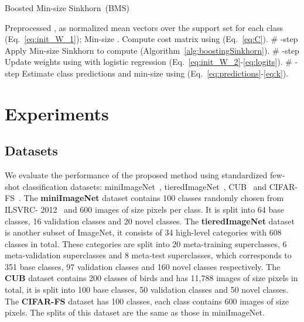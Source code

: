 \documentclass[review]{elsarticle}
\begin{document}
\begin{algorithm}[tb]
   \caption{Boosted Min-size Sinkhorn~(BMS)}
   \label{alg:CSC}
\begin{algorithmic}
    {}
    {Preprocessed , }
     as normalized mean vectors over the support set for each class (Eq.~\ref{eq:init_W_1}); Min-size .
   \STATE Compute cost matrix  using  (Eq.~\ref{eq:C}). \# -step
   \STATE Apply Min-size Sinkhorn to compute  (Algorithm~\ref{alg:boostingSinkhorn}). \# -step
   \STATE Update weights  using  with logistic regression (Eq.~\ref{eq:init_W_2}-\ref{eq:logits}). \# -step
   \STATE Estimate class predictions  and min-size  using  (Eq.~\ref{eq:predictions}-\ref{eq:k}).
   \ENDFOR
{} 
\end{algorithmic}
\end{algorithm}





















\section{Experiments}
\label{experiments}
\subsection{Datasets}

We evaluate the performance of the proposed method using standardized few-shot classification datasets: miniImageNet~\cite{vinyals2016matching}, tieredImageNet~\cite{DBLP:conf/iclr/RenTRSSTLZ18}, CUB~\cite{WahCUB_200_2011} and CIFAR-FS~\cite{DBLP:conf/iclr/BertinettoHTV19}. The \textbf{miniImageNet} dataset contains 100 classes randomly chosen from ILSVRC-
2012~\cite{russakovsky2015imagenet} and 600 images of size  pixels per class. It is split into 64 base classes, 16 validation classes and 20 novel classes. The \textbf{tieredImageNet} dataset is another subset of ImageNet, it consists of 34 high-level categories with 608 classes in total. These categories are split into 20 meta-training superclasses, 6 meta-validation superclasses and 8 meta-test superclasses, which corresponds to 351 base classes, 97 validation classes and 160 novel classes respectively. The \textbf{CUB} dataset contains 200 classes of birds and has 11,788 images of size  pixels in total, it is split into 100 base classes, 50 validation classes and 50 novel classes. The \textbf{CIFAR-FS} dataset has 100 classes, each class contains 600 images of size  pixels. The splits of this dataset are the same as those in miniImageNet.
\end{document}
